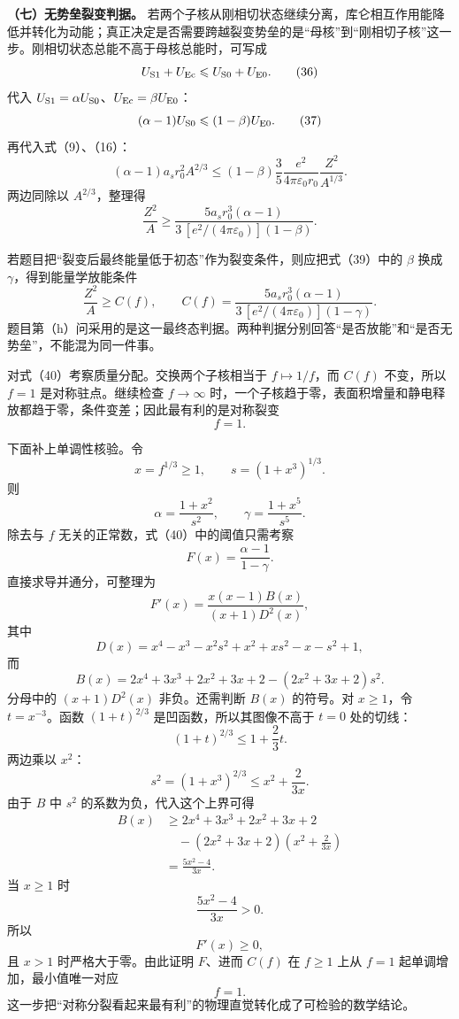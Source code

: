 \documentclass[12pt,a4paper,UTF8]{ctexart}
\begin{document}
\textbf{（七）无势垒裂变判据。}
若两个子核从刚相切状态继续分离，库仑相互作用能降低并转化为动能；真正决定是否需要跨越裂变势垒的是``母核''到``刚相切子核''这一步。刚相切状态总能不高于母核总能时，可写成
\[
U_{\rm S1}+U_{\rm Ec}
\leqslant U_{\rm S0}+U_{\rm E0}. \tag{36}
\] 代入
\(U_{\rm S1}=\alpha U_{\rm S0}\)、\(U_{\rm Ec}=\beta U_{\rm E0}\)： \[
(\alpha-1)U_{\rm S0}
\leqslant(1-\beta)U_{\rm E0}. \tag{37}
\] 再代入式（9）、（16）： \[
(\alpha-1)a_sr_0^2A^{2/3}
\leqslant
(1-\beta)\frac35
\frac{e^2}{4\pi\varepsilon_0r_0}
\frac{Z^2}{A^{1/3}}. \tag{38}
\] 两边同除以 \(A^{2/3}\)，整理得 \[
\boxed{
\frac{Z^2}{A}
\geqslant
\frac{
5a_sr_0^3(\alpha-1)
}{
3\,[e^2/(4\pi\varepsilon_0)](1-\beta)
}
}. \tag{39}
\]

若题目把``裂变后最终能量低于初态''作为裂变条件，则应把式（39）中的
\(\beta\) 换成 \(\gamma\)，得到能量学放能条件 \[
\boxed{
\frac{Z^2}{A}
\geqslant
C(f),
\qquad
C(f)=
\frac{
5a_sr_0^3(\alpha-1)
}{
3\,[e^2/(4\pi\varepsilon_0)](1-\gamma)
}
}. \tag{40}
\]
题目第（h）问采用的是这一最终态判据。两种判据分别回答``是否放能''和``是否无势垒''，不能混为同一件事。

对式（40）考察质量分配。交换两个子核相当于 \(f\mapsto1/f\)，而 \(C(f)\)
不变，所以 \(f=1\) 是对称驻点。继续检查 \(f\to\infty\)
时，一个子核趋于零，表面积增量和静电释放都趋于零，条件变差；因此最有利的是对称裂变
\[
\boxed{f=1}. \tag{41}
\]

下面补上单调性核验。令 \[
x=f^{1/3}\geqslant1,
\qquad
s=(1+x^3)^{1/3}.
\] 则 \[
\alpha=\frac{1+x^2}{s^2},
\qquad
\gamma=\frac{1+x^5}{s^5}.
\] 除去与 \(f\) 无关的正常数，式（40）中的阈值只需考察 \[
F(x)=\frac{\alpha-1}{1-\gamma}.
\] 直接求导并通分，可整理为 \[
F'(x)
=\frac{x(x-1)B(x)}
{(x+1)D^2(x)},
\] 其中 \[
D(x)
=x^4-x^3-x^2s^2+x^2+xs^2-x-s^2+1,
\] 而 \[
B(x)
=2x^4+3x^3+2x^2+3x+2
-(2x^2+3x+2)s^2.
\] 分母中的 \((x+1)D^2(x)\) 非负。还需判断 \(B(x)\) 的符号。对
\(x\geqslant1\)，令 \(t=x^{-3}\)。函数 \((1+t)^{2/3}\)
是凹函数，所以其图像不高于 \(t=0\) 处的切线： \[
(1+t)^{2/3}\leqslant1+\frac23t.
\] 两边乘以 \(x^2\)： \[
s^2=(1+x^3)^{2/3}
\leqslant x^2+\frac{2}{3x}.
\] 由于 \(B\) 中 \(s^2\) 的系数为负，代入这个上界可得 \[
\begin{aligned}
B(x)
&\geqslant
2x^4+3x^3+2x^2+3x+2\\
&\quad
-(2x^2+3x+2)
\left(x^2+\frac{2}{3x}\right)\\
&=\frac{5x^2-4}{3x}.
\end{aligned}
\] 当 \(x\geqslant1\) 时 \[
\frac{5x^2-4}{3x}>0.
\] 所以 \[
F'(x)\geqslant0,
\] 且 \(x>1\) 时严格大于零。由此证明 \(F\)、进而 \(C(f)\) 在
\(f\geqslant1\) 上从 \(f=1\) 起单调增加，最小值唯一对应 \[
\boxed{f=1}.
\] 这一步把``对称分裂看起来最有利''的物理直觉转化成了可检验的数学结论。
\end{document}
